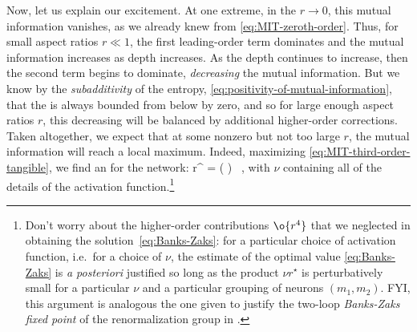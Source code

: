 Now, let us explain our excitement.
At one extreme, in the  $r\to 0$, this mutual information vanishes, as we already knew from \eqref{eq:MIT-zeroth-order}. Thus, for small aspect ratios $r \ll 1$, the first leading-order term dominates and the mutual information increases as depth increases. As the depth continues to increase, then the second term begins to dominate, \emph{decreasing} the mutual information. But we know by the \emph{subadditivity} of the entropy, \eqref{eq:positivity-of-mutual-information}, that the  is always bounded from below by zero,
and so for large enough aspect ratios $r$, this decreasing will be balanced by additional higher-order corrections. Taken altogether, we expect that at some nonzero but not too large $r$, the mutual information will reach a local maximum.
Indeed, maximizing \eqref{eq:MIT-third-order-tangible}, we find an  for the network:
\be\label{eq:Banks-Zaks}
r^{\star} = \le( \ri) \, ,
\ee
with $\nu$ containing all of the details of the activation function.\footnote{Don't worry about the higher-order contributions $\o{r^4}$ that we neglected in obtaining the solution~\eqref{eq:Banks-Zaks}: for a particular choice of activation function, i.e.~for a choice of $\nu$, the estimate of the optimal value \eqref{eq:Banks-Zaks} is \emph{a posteriori} justified so long as the product $\nu r^{\star}$ is perturbatively small for a particular  $\nu$ and a particular grouping of neurons $(m_1, m_2)$.  FYI, this argument is analogous 
the one given to justify the two-loop \emph{Banks-Zaks fixed point} of the renormalization group  in  \cite{banks1982phase}.}








